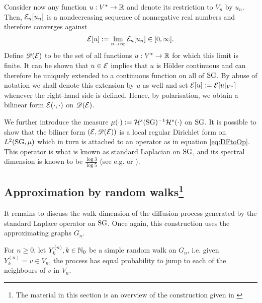 Consider now any function $u:V^*\to\mathbb{R}$ and denote its restriction to $V_n$ by $u_n$. Then, $\mathcal{E}_n[u_n]$ is a nondecreasing sequence of nonnegative real numbers and therefore converges against 
\[
  \mathcal{E}[u]:=\lim_{n\to\infty} \mathcal{E}_n[u_n]\in[0,\infty].
\]
Define $\mathscr{D}(\mathcal{E})$ to be the set of all functions $u:V^*\to\mathbb{R}$ for which this limit is finite. It can be shown that $u\in\mathcal{E}$ implies that $u$ is H\"older continuous and can therefore be uniquely extended to a continuous function on all of $\operatorname{SG}$. By abuse of notation we shall denote this extension by $u$ as well and set $\mathcal{E}[u]:=\mathcal{E}[u|_{V^*}]$ whenever the right-hand side is defined. Hence, by polarisation, we obtain a bilinear form $\mathcal{E}(\cdot,\cdot)$ on $\mathscr{D}(\mathcal{E})$. 

We further introduce the measure 
$\mu(\cdot):=\mathcal{H}^s(\operatorname{SG})^{-1}\mathcal{H}^s(\cdot)$ on $\operatorname{SG}$. It is possible to show that the biliner form $(\mathcal{E},\mathscr{D}(\mathcal{E}))$ is a local regular Dirichlet form on $L^2(\operatorname{SG},\mu)$ which in turn is attached to an operator as in equation \eqref{eq:DFtoOp}. This operator is what is known as standard Laplacian on $\operatorname{SG}$, and its spectral dimension is known to be $\frac{\log 3}{\log 5}$ (see e.g. \cite[section 3.5]{strichartz2006differential} or \cite{kigami1993weyl}). 

\subsection[Approximation by random walks]{Approximation by random walks\protect\footnote{The material in this section is an overview of the construction given in \cite[chapter II]{barlow1998diffusions}}}

It remains to discuss the walk dimension of the diffusion process generated by the standard Laplace operator on $\operatorname{SG}$. Once again, this construction uses the approximating graphs $G_n$. 

For $n\geq0$, let $Y^{(n)}_k, k\in\mathbb{N}_0$ be a simple random walk on $G_n$, i.e. given $Y^{(n)}_k=v\in V_n$, the process has equal probability to jump to each of the neighbours of $v$ in $V_n$. 


